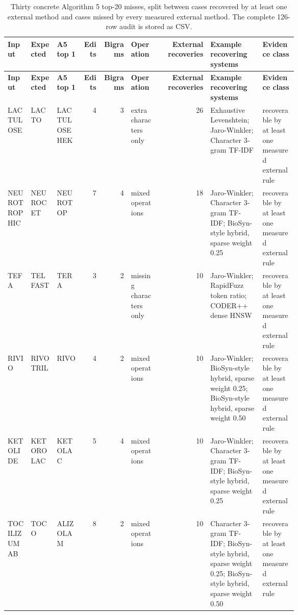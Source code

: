 \begin{landscape}
\begin{tiny}
\setlength{\tabcolsep}{0.7pt}
\renewcommand{\arraystretch}{1.05}
\begin{longtable}{@{}L{0.08\linewidth}L{0.09\linewidth}L{0.09\linewidth}rrL{0.10\linewidth}rL{0.18\linewidth}L{0.12\linewidth}@{}}
\caption{Thirty concrete Algorithm 5 top-20 misses, split between cases recovered by at least one external method and cases missed by every measured external method. The complete 126-row audit is stored as CSV.}\label{tab:expanded-a5-failure-examples}\\
\toprule
\textbf{Input} & \textbf{Expected} & \textbf{A5 top 1} & \textbf{Edits} & \textbf{Bigrams} & \textbf{Operation} & \textbf{External recoveries} & \textbf{Example recovering systems} & \textbf{Evidence class} \\
\midrule
\endfirsthead
\toprule
\textbf{Input} & \textbf{Expected} & \textbf{A5 top 1} & \textbf{Edits} & \textbf{Bigrams} & \textbf{Operation} & \textbf{External recoveries} & \textbf{Example recovering systems} & \textbf{Evidence class} \\
\midrule
\endhead
LACTULOSE & LACTO & LACTULOSE HEK & 4 & 3 & extra characters only & 26 & Exhaustive Levenshtein; Jaro-Winkler; Character 3-gram TF-IDF & recoverable by at least one measured external rule \\
NEUROTROPHIC & NEUROCET & NEUROTOP & 7 & 4 & mixed operations & 18 & Jaro-Winkler; Character 3-gram TF-IDF; BioSyn-style hybrid, sparse weight 0.25 & recoverable by at least one measured external rule \\
TEFA & TELFAST & TERA & 3 & 2 & missing characters only & 10 & Jaro-Winkler; RapidFuzz token ratio; CODER++ dense HNSW & recoverable by at least one measured external rule \\
RIVIO & RIVOTRIL & RIVO & 4 & 2 & mixed operations & 10 & Jaro-Winkler; BioSyn-style hybrid, sparse weight 0.25; BioSyn-style hybrid, sparse weight 0.50 & recoverable by at least one measured external rule \\
KETOLIDE & KETOROLAC & KETOLAC & 5 & 4 & mixed operations & 10 & Jaro-Winkler; Character 3-gram TF-IDF; BioSyn-style hybrid, sparse weight 0.25 & recoverable by at least one measured external rule \\
TOCILIZUMAB & TOCO & ALIZOLAM & 8 & 2 & mixed operations & 10 & Character 3-gram TF-IDF; BioSyn-style hybrid, sparse weight 0.25; BioSyn-style hybrid, sparse weight 0.50 & recoverable by at least one measured external rule \\

\end{longtable}
\end{tiny}
\end{landscape}
